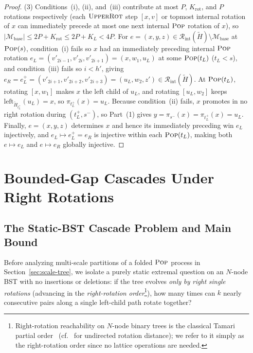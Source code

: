 \documentclass[11pt]{article}
\theoremstyle{definition}
\theoremstyle{remark}
\newcommand{\POP}{\textnormal{\scshape Pop}}
\newcommand{\UPROT}{\textnormal{\scshape UpperRot}}
\begin{document}
\begin{proof}
(3) Conditions~(i), (ii), and~(iii) contribute at most $P$, $K_{\mathrm{rot}}$, and $P$ rotations respectively (each $\UPROT$ step $[x, v]$ or topmost internal rotation of $x$ can immediately precede at most one next internal $\POP$ rotation of $x$), so $|\mathcal{M}_{\mathrm{base}}| \le 2P + K_{\mathrm{rot}} \le 2P + K_L < 4P$. For $e = (x, y, z) \in \mathcal{R}_{\mathrm{int}}(\widetilde{H}) \setminus \mathcal{M}_{\mathrm{base}}$ at $\POP(s)$, condition~(i) fails so $x$ had an immediately preceding internal $\POP$ rotation $e_L = (v'_{2i-1}, v'_{2i}, v'_{2i+1}) = (x, w_1, u_L)$ at some $\POP(t_L)$ ($t_L < s$), and condition~(iii) fails so $i < h'$, giving $e_R = e_L^+ = (v'_{2i+1}, v'_{2i+2}, v'_{2i+3}) = (u_L, w_2, z') \in \mathcal{R}_{\mathrm{int}}(\widetilde{H})$. At $\POP(t_L)$, rotating $[x, w_1]$ makes $x$ the left child of $u_L$, and rotating $[u_L, w_2]$ keeps $\mathrm{left}_{\widetilde{H}_{t_L^+}}(u_L) = x$, so $\pi_{t_L^+}(x) = u_L$. Because condition~(ii) fails, $x$ promotes in no right rotation during $(t_L^+, s^-)$, so Part~(1) gives $y = \pi_{s^-}(x) = \pi_{t_L^+}(x) = u_L$. Finally, $e = (x, y, z)$ determines $x$ and hence its immediately preceding win $e_L$ injectively, and $e_L \mapsto e_L^+ = e_R$ is injective within each $\POP(t_L)$, making both $e \mapsto e_L$ and $e \mapsto e_R$ globally injective.
\end{proof}



\section{Bounded-Gap Cascades Under Right Rotations}
\label{sec:cascades}

\subsection{The Static-BST Cascade Problem and Main Bound}
\label{subsec:overview-mod2}

Before analyzing multi-scale partitions of a folded $\POP$ process in Section~\ref{sec:scale-tree}, we isolate a purely static extremal question on an $N$-node BST with no insertions or deletions: if the tree evolves \emph{only by right single rotations} (advancing in the \emph{right-rotation order}\footnote{Right-rotation reachability on $N$-node binary trees is the classical Tamari partial order~\cite{Tamari1962,FriedmanTamari1967,HuangTamari1972,Pallo1986,BjornerWachs1997,Knuth2011Vol4A} (cf.~\cite{SleatorTarjanThurston1988} for undirected rotation distance); we refer to it simply as the right-rotation order since no lattice operations are needed.}), how many times can $k$ nearly consecutive pairs along a single left-child path rotate together?
\end{document}
